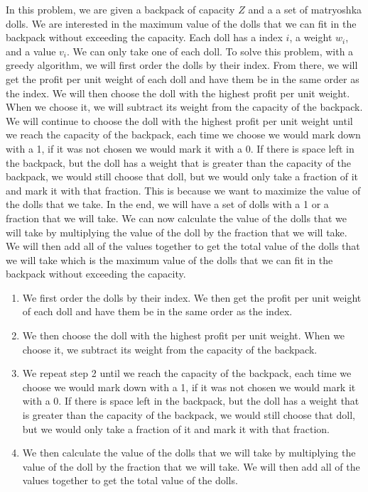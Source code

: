 \documentclass[12pt,letterpaper]{article}
\begin{document}
In this problem, we are given a backpack of capacity $Z$ and a a set of matryoshka dolls.
We are interested in the maximum value of the dolls that we can fit in the backpack without
exceeding the capacity. Each doll has a index $i$, a weight $w_i$, and a value $v_i$. We
can only take one of each doll. To solve this problem, with a greedy algorithm, we will
first order the dolls by their index. From there, we will get the profit per unit weight of
each doll and have them be in the same order as the index. We will then choose the doll
with the highest profit per unit weight. When we choose it, we will subtract its weight from
the capacity of the backpack. We will continue to choose the doll with the highest profit
per unit weight until we reach the capacity of the backpack, each time we choose we would
mark down with a 1, if it was not chosen we would mark it with a 0. If there is space left in the
backpack, but the doll has a weight that is greater than the capacity of the backpack,
we would still choose that doll, but we would only take a fraction of it and mark it with that fraction. 
This is because we want to maximize the value of the dolls that we take. In the end, we will have a set of
dolls with a 1 or a fraction that we will take. We can now calculate the value of the dolls
that we will take by multiplying the value of the doll by the fraction that we will take. We
will then add all of the values together to get the total value of the dolls that we will take
which is the maximum value of the dolls that we can fit in the backpack without exceeding
the capacity.
\begin{enumerate}
  \item We first order the dolls by their index. We then get the profit per unit weight of
each doll and have them be in the same order as the index. 
  \item We then choose the doll with the highest profit per unit weight. When we choose it, we
subtract its weight from the capacity of the backpack. 
  \item We repeat step 2 until we reach the capacity of the backpack, each time we choose we
would mark down with a 1, if it was not chosen we would mark it with a 0. If there is space
left in the backpack, but the doll has a weight that is greater than the capacity of the
backpack, we would still choose that doll, but we would only take a fraction of it and mark
it with that fraction. 
  \item We then calculate the value of the dolls that we will take by multiplying the value of
the doll by the fraction that we will take. We will then add all of the values together to
get the total value of the dolls.
\end{enumerate}
\end{document}
